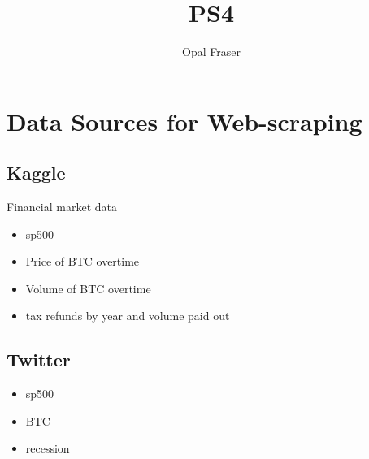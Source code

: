 \documentclass{article}
\title{PS4}
\author{Opal Fraser}
\begin{document}
\maketitle

\section{Data Sources for Web-scraping}

\subsection{Kaggle}
Financial market data
\begin{itemize}
\item sp500
\item Price of BTC overtime
\item Volume of BTC overtime
\item tax refunds by year and volume paid out 
\end{itemize}
\subsection {Twitter}
\begin{itemize}
\item sp500
\item BTC
\item recession
\end{itemize}
\end{document}
